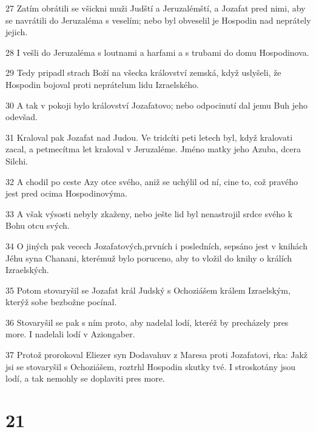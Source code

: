 \par 27 Zatím obrátili se všickni muži Judští a Jeruzalémští, a Jozafat pred nimi, aby se navrátili do Jeruzaléma s veselím; nebo byl obveselil je Hospodin nad neprátely jejich.
\par 28 I vešli do Jeruzaléma s loutnami a harfami a s trubami do domu Hospodinova.
\par 29 Tedy pripadl strach Boží na všecka království zemská, když uslyšeli, že Hospodin bojoval proti neprátelum lidu Izraelského.
\par 30 A tak v pokoji bylo království Jozafatovo; nebo odpocinutí dal jemu Buh jeho odevšad.
\par 31 Kraloval pak Jozafat nad Judou. Ve tridcíti peti letech byl, když kralovati zacal, a petmecítma let kraloval v Jeruzaléme. Jméno matky jeho Azuba, dcera Silchi.
\par 32 A chodil po ceste Azy otce svého, aniž se uchýlil od ní, cine to, což pravého jest pred ocima Hospodinovýma.
\par 33 A však výsosti nebyly zkaženy, nebo ješte lid byl nenastrojil srdce svého k Bohu otcu svých.
\par 34 O jiných pak vecech Jozafatových,prvních i posledních, sepsáno jest v knihách Jéhu syna Chanani, kterémuž bylo poruceno, aby to vložil do knihy o králích Izraelských.
\par 35 Potom stovaryšil se Jozafat král Judský s Ochoziášem králem Izraelským, kterýž sobe bezbožne pocínal.
\par 36 Stovaryšil se pak s ním proto, aby nadelal lodí, kteréž by precházely pres more. I nadelali lodí v Aziongaber.
\par 37 Protož prorokoval Eliezer syn Dodavahuv z Maresa proti Jozafatovi, rka: Jakž jsi se stovaryšil s Ochoziášem, roztrhl Hospodin skutky tvé. I stroskotány jsou lodí, a tak nemohly se doplaviti pres more.

\chapter{21}

